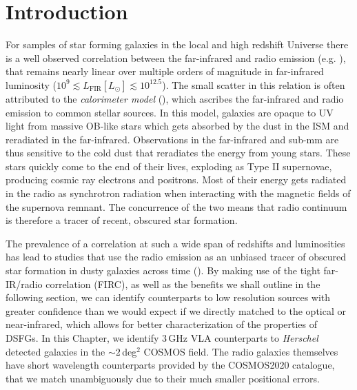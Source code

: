 \sloppy

\section{Introduction}

For samples of star forming galaxies in the local and high redshift Universe there is a well observed correlation between the far-infrared and radio emission (e.g. \citealt{Dickey_1984, deJong_1985, Helou_1985, Condon_1992, Barger_2000, Yun_2001, Garrett_2002, Appleton_2004, Ibar_2008, Seymour_2009, Sargent_2010}), that remains nearly linear over multiple orders of magnitude in far-infrared luminosity ($10^{9} \lesssim L_{\textrm{FIR}} [L_{\odot}] \lesssim 10^{12.5}$). The small scatter in this relation is often attributed to the \textit{calorimeter model} (\citealt{Voelk_1989, Lisenfeld_1996, Lacki_2010}), which ascribes the far-infrared and radio emission to common stellar sources. In this model, galaxies are opaque to UV light from massive OB-like stars which gets absorbed by the dust in the ISM and reradiated in the far-infrared. Observations in the far-infrared and sub-mm are thus sensitive to the cold dust that reradiates the energy from young stars. These stars quickly come to the end of their lives, exploding as Type II supernovae, producing cosmic ray electrons and positrons. Most of their energy gets radiated in the radio as synchrotron radiation when interacting with the magnetic fields of the supernova remnant. The concurrence of the two means that radio continuum is therefore a tracer of recent, obscured star formation.

The prevalence of a correlation at such a wide span of redshifts and luminosities has lead to studies that use the radio emission as an unbiased tracer of obscured star formation in dusty galaxies across time (\citealt{Kennicutt_2012}). By making use of the tight far-IR/radio correlation (FIRC), as well as the benefits we shall outline in the following section, we can identify counterparts to low resolution sources with greater confidence than we would expect if we directly matched to the optical or near-infrared, which allows for better characterization of the properties of DSFGs. In this Chapter, we identify $3\,$GHz VLA counterparts to \textit{Herschel} detected galaxies in the $\sim2\,$deg$^2$ COSMOS field. The radio galaxies themselves have short wavelength counterparts provided by the COSMOS2020 catalogue, that we match unambiguously due to their much smaller positional errors.

